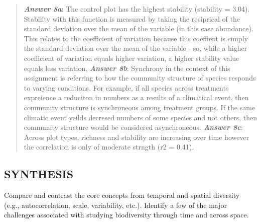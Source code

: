 \documentclass[]{article}
\begin{document}
\begin{quote}
\textbf{\emph{Answer 8a}}: The control plot has the highest stability
(stability = 3.04). Stability with this function is measured by taking
the reciprical of the standard deviation over the mean of the variable
(in this case abundance). This relates to the coefficient of variation
because this coeffient is simply the standard deviation over the mean of
the variable - so, while a higher coefficient of variation equals higher
variation, a higher stability value equals less variation.
\textbf{\emph{Answer 8b}}: Synchrony in the context of this assignment
is referring to how the community structure of species responds to
varying conditions. For example, if all species across treatments
expreience a reduciton in numbers as a results of a climatical event,
then community structure is synchroneous among treatment groups. If the
same climatic event yeilds decresed numbers of some species and not
others, then community structure would be considered asynchroneous.
\textbf{\emph{Answer 8c}}: Across plot types, richness and stability are
increasing over time however the correlation is only of moderate strngth
(r2 = 0.41).
\end{quote}

\subsection{SYNTHESIS}\label{synthesis}

Compare and contrast the core concepts from temporal and spatial
diversity (e.g., autocorrelation, scale, variability, etc.). Identify a
few of the major challenges associated with studying biodiversity
through time and across space.
\end{document}
